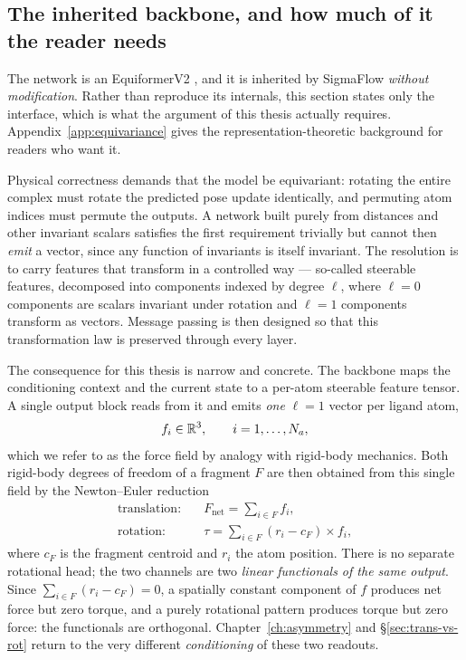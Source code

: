 \subsection{The inherited backbone, and how much of it the reader needs}
\label{sec:backbone}

The network is an EquiformerV2 \citep{liao2024equiformerv2}, and it is
inherited by SigmaFlow \emph{without modification}. Rather than reproduce its
internals, this section states only the interface, which is what the argument
of this thesis actually requires. Appendix~\ref{app:equivariance} gives the
representation-theoretic background for readers who want it.

Physical correctness demands that the model be equivariant: rotating the
entire complex must rotate the predicted pose update identically, and
permuting atom indices must permute the outputs. A network built purely from
distances and other invariant scalars satisfies the first requirement
trivially but cannot then \emph{emit} a vector, since any function of
invariants is itself invariant. The resolution is to carry features that
transform in a controlled way --- so-called steerable features, decomposed
into components indexed by degree $\ell$, where $\ell=0$ components are scalars
invariant under rotation and $\ell=1$ components transform as vectors. Message
passing is then designed so that this transformation law is preserved through
every layer.

The consequence for this thesis is narrow and concrete. The backbone maps the
conditioning context and the current state to a per-atom steerable feature
tensor. A single output block reads from it and emits \emph{one} $\ell=1$
vector per ligand atom,
\begin{equation}
  f_i \in \mathbb{R}^3, \qquad i = 1,\dots,N_a ,
  \label{eq:force-field}
\end{equation}
which we refer to as the force field by analogy with rigid-body mechanics.
Both rigid-body degrees of freedom of a fragment $F$ are then obtained from
this single field by the Newton--Euler reduction
\begin{align}
  \text{translation:}\quad & \textstyle F_{\mathrm{net}} = \sum_{i \in F} f_i ,
  \label{eq:reduce-trans}\\
  \text{rotation:}\quad & \textstyle \tau = \sum_{i \in F} (r_i - c_F) \times f_i ,
  \label{eq:reduce-rot}
\end{align}
where $c_F$ is the fragment centroid and $r_i$ the atom position. There is no
separate rotational head; the two channels are two \emph{linear functionals of
the same output}. Since $\sum_{i \in F} (r_i - c_F) = 0$, a spatially constant
component of $f$ produces net force but zero torque, and a purely rotational
pattern produces torque but zero force: the functionals are orthogonal.
Chapter~\ref{ch:asymmetry} and \S\ref{sec:trans-vs-rot} return to the very
different \emph{conditioning} of these two readouts.

